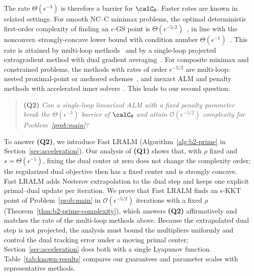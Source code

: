 
The rate $\Theta(\epsilon^{-3})$ is therefore a barrier for $\calC_\theta$.
Faster rates are known in related settings. For smooth NC--C minimax problems,
the optimal deterministic first-order complexity of finding an $\epsilon$-GS
point is $\Theta(\epsilon^{-5/2})$~\cite{pan2026optimal}, in line with the
nonconvex--strongly-concave lower bound with condition number
$\Theta(\epsilon^{-1})$~\cite{zhang2021complexity,li2021complexity}. This rate
is attained by multi-loop methods~\cite{pan2026optimal} and by a single-loop
projected extragradient method with dual gradient
averaging~\cite{zhang2026matching}. For composite minimax and constrained
problems, the methods with rates of order $\epsilon^{-5/2}$ are multi-loop:
nested proximal-point or anchored
schemes~\cite{kong2021accelerated,ke2026efficient}, and inexact ALM and
penalty methods with accelerated inner
solvers~\cite{li2021rate,lin2022complexity,kong2023iteration}. This leads to
our second question:
\begin{quote}
  \textbf{(Q2)}
  \emph{Can a single-loop linearized ALM with a fixed penalty parameter break
  the $\Theta(\epsilon^{-3})$ barrier of $\calC_\theta$ and attain
  $\mathcal O(\epsilon^{-5/2})$ complexity for Problem~\eqref{prob:main}?}
\end{quote}

To answer \textbf{(Q2)}, we introduce Fast LRALM (Algorithm~\ref{alg:b2-prime}
in Section~\ref{sec:acceleration}). Our analysis of \textbf{(Q1)} shows that,
with $\rho$ fixed and $s=\Theta(\epsilon^{-1})$, fixing the dual center at zero
does not change the complexity order; the regularized dual objective then has a
fixed center and is strongly concave. Fast LRALM adds Nesterov extrapolation to
the dual step and keeps one explicit primal--dual update per iteration. We
prove that Fast LRALM finds an $\epsilon$-KKT point of
Problem~\eqref{prob:main} in $\mathcal O(\epsilon^{-5/2})$ iterations with a
fixed $\rho$ (Theorem~\ref{thm:b2-prime-complexity}), which answers
\textbf{(Q2)} affirmatively and matches the rate of the multi-loop methods
above. Because the extrapolated dual step is not projected, the analysis must
bound the multipliers uniformly and control the dual tracking error under a
moving primal center; Section~\ref{sec:acceleration} does both with a single
Lyapunov function. Table~\ref{tab:known-results} compares our guarantees and
parameter scales with representative methods.

